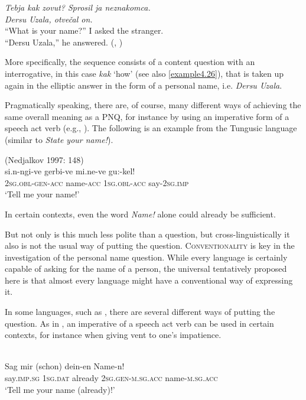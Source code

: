 \documentclass[output=paper,colorlinks,citecolor=brown]{langscibook}
\begin{document}
\ea
\label{example4.10}
\textit{Tebja kak zovut? Sprosil ja neznakomca.}\\
\textit{Dersu Uzala, otvečal on.}\\
“What is your name?” I asked the stranger.\\
“Dersu Uzala,” he answered. (\citealt{Arsenjev1921}, \citeyear[18]{Arsenjev2016})
\z

\noindent More specifically, the sequence consists of a content question with an interrogative, in this case  \textit{kak} ‘how’ (see also \ref{example4.26}), that is taken up again in the elliptic answer in the form of a personal name, i.e. \textit{Dersu Uzala}.

Pragmatically speaking, there are, of course, many different ways of achieving the same overall meaning as a PNQ, for instance by using an imperative form of a speech act verb (e.g., \citealt[254]{Schulze2007}). The following is an example from the Tungusic language  (similar to \textit{State your name!}).

\ea
    \label{example4.11}
     (Nedjalkov 1997: 148)\\
    \gll si.n-ngi-ve		gerbi-ve		mi.ne-ve		gu:-kel!\\
    2\textsc{sg.obl-gen-acc}	name-\textsc{acc}	1\textsc{sg.obl-acc}		say-2\textsc{sg.imp}\\
	\glt ‘Tell me your name!’
\z

\noindent In certain contexts, even the word \textit{Name!} alone could already be sufficient.

But not only is this much less polite than a question, but cross-linguistically it also is not the usual way of putting the question. \textsc{Conventionality} is key in the investigation of the personal name question. While every language is certainly capable of asking for the name of a person, the universal tentatively proposed here is that almost every language might have a conventional way of expressing it.

In some languages, such as , there are several different ways of putting the question. As in , an imperative of a speech act verb can be used in certain contexts, for instance when giving vent to one’s impatience.

\ea
    \label{example4.12}
    \\
    \gll Sag			mir		(schon)		dein-en			Name-n!\\
    say.\textsc{imp.sg}	\textsc{1sg.dat}	already		2\textsc{sg.gen-m.sg.acc}	name-\textsc{m.sg.acc}\\
    \glt ‘Tell me your name (already)!’
    \z
\end{document}
